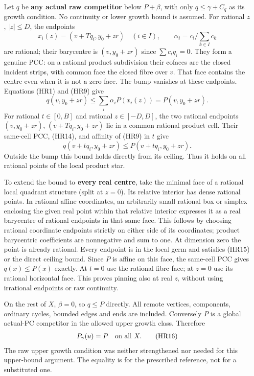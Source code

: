 \documentclass[
  11pt,
]{article}
\begin{document}
Let \(q\) be \textbf{any actual raw competitor} below \(P+\beta\), with
only \(q\leq\gamma+C_q\) as its growth condition. No continuity or lower
growth bound is assumed. For rational \(z\), \(|z|\leq D\), the
endpoints \[
        x_i(z)=(v+Tq_i,y_0+zr)\quad(i\in I),\qquad
        \alpha_i=c_i/\sum_{k\in I}c_k                       \tag{HR13}
\] are rational; their barycentre is \((v,y_0+zr)\) since
\(\sum c_iq_i=0\). They form a genuine PCC: on a rational product
subdivision their cofaces are the closed incident strips, with common
face the closed fibre over \(v\). That face contains the centre even
when it is not a zero-face. The bump vanishes at these endpoints.
Equations (HR1) and (HR9) give \[
 q(v,y_0+zr)\leq\sum_i\alpha_iP(x_i(z))
       =P(v,y_0+zr).                                        \tag{HR14}
\] For rational \(t\in[0,B]\) and rational \(z\in[-D,D]\), the two
rational endpoints \((v,y_0+zr)\), \((v+Tq_i,y_0+zr)\) lie in a common
rational product cell. Their same-cell PCC, (HR14), and affinity of
(HR9) in \(t\) give \[
              q(v+tq_i,y_0+zr)\leq P(v+tq_i,y_0+zr).        \tag{HR15}
\] Outside the bump this bound holds directly from its ceiling. Thus it
holds on all rational points of the local product star.

To extend the bound to \textbf{every real centre}, take the minimal face
of a rational local quadrant structure (split at \(z=0\)). Its relative
interior has dense rational points. In rational affine coordinates, an
arbitrarily small rational box or simplex enclosing the given real point
within that relative interior expresses it as a real barycentre of
rational endpoints in that same face. This follows by choosing rational
coordinate endpoints strictly on either side of its coordinates; product
barycentric coefficients are nonnegative and sum to one. At dimension
zero the point is already rational. Every endpoint is in the local germ
and satisfies (HR15) or the direct ceiling bound. Since \(P\) is affine
on this face, the same-cell PCC gives \(q(x)\leq P(x)\) exactly. At
\(t=0\) use the rational fibre face; at \(z=0\) use its rational
horizontal face. This proves pinning also at real \(z\), without using
irrational endpoints or raw continuity.

On the rest of \(X\), \(\beta=0\), so \(q\leq P\) directly. All remote
vertices, components, ordinary cycles, bounded edges and ends are
included. Conversely \(P\) is a global actual-PC competitor in the
allowed upper growth class. Therefore \[
                    P_\gamma(u)=P\quad\hbox{on all }X.     \tag{HR16}
\] The raw upper growth condition was neither strengthened nor needed
for this upper-bound argument. The equality is for the prescribed
reference, not for a substituted one.
\end{document}
